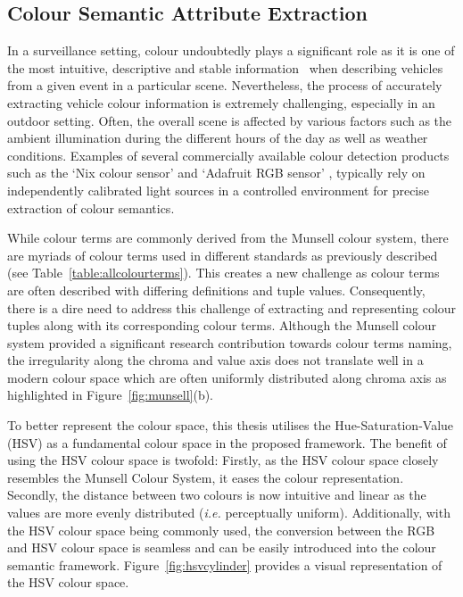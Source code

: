 \vspace{1em}
\subsection{Colour Semantic Attribute Extraction}
\label{subsec:colorsemantics}

In a surveillance setting, colour undoubtedly plays a significant role as it is one of the most intuitive, descriptive and stable information~\cite{zhang2017vehicle} when describing vehicles from a given event in a particular scene.
Nevertheless, the process of accurately extracting vehicle colour information is extremely challenging, especially in an outdoor setting. Often, the overall scene is affected by various factors such as the ambient illumination during the different hours of the day as well as weather conditions.
Examples of several commercially available colour detection products such as the `Nix colour sensor' \cite{nixsensorltd} and `Adafruit RGB sensor' \cite{adafruit}, typically rely on independently calibrated light sources in a controlled environment for precise extraction of colour semantics.

While colour terms are commonly derived from the Munsell colour system, there are myriads of colour terms used in different standards as previously described (see Table~\ref{table:allcolourterms}). %
This creates a new challenge as colour terms are often described with differing definitions and tuple values.
Consequently, there is a dire need to address this challenge of extracting and representing colour tuples along with its corresponding colour terms.
Although the Munsell colour system provided a significant research contribution towards colour terms naming, the irregularity along the chroma and value axis does not translate well in a modern colour space which are often uniformly distributed along chroma axis as highlighted in Figure~\ref{fig:munsell}(b).

To better represent the colour space, this thesis utilises the Hue-Saturation-Value (HSV) as a fundamental colour space in the proposed framework.
The benefit of using the HSV colour space is twofold: Firstly, as the HSV colour space closely resembles the Munsell Colour System, it eases the colour representation.
Secondly, the distance between two colours is now intuitive and linear as the values are more evenly distributed (\emph{i.e.} perceptually uniform).
Additionally, with the HSV colour space being commonly used, the conversion between the RGB and HSV colour space is seamless and can be easily introduced into the colour semantic framework. Figure~\ref{fig:hsvcylinder} provides a visual representation of the HSV colour space.

